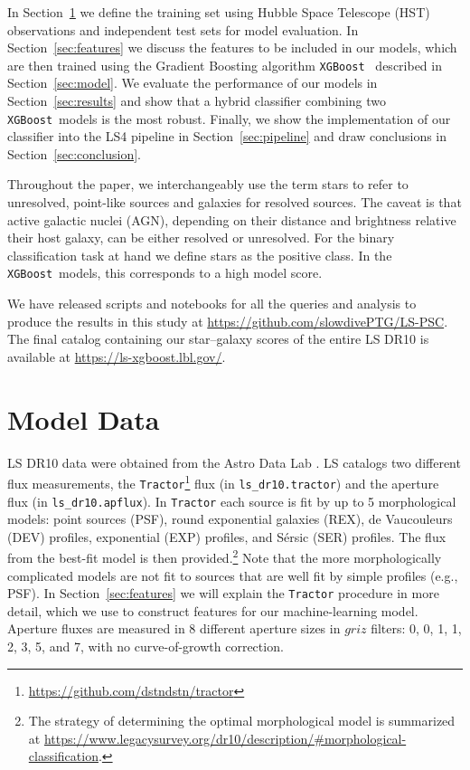 \documentclass[twocolumn,tighten]{aastex631}
\newcommand{\xgboost}{\texttt{XGBoost}}
\newcommand{\dr}[1]{DR{#1}}
\begin{document}
\begin{CJK*}{UTF8}{gbsn}
In Section~\ref{sec:data} we define the training set using Hubble Space Telescope (HST) observations and independent test sets for model evaluation. In Section~\ref{sec:features} we discuss the features to be included in our models, which are then trained using the Gradient Boosting algorithm \xgboost\ \citep{XGBoost_2016} described in Section~\ref{sec:model}. We evaluate the performance of our models in Section~\ref{sec:results} and show that a hybrid classifier combining two \xgboost\ models is the most robust. Finally, we show the implementation of our classifier into the LS4 pipeline in Section~\ref{sec:pipeline} and draw conclusions in Section~\ref{sec:conclusion}.

Throughout the paper, we interchangeably use the term stars to refer to unresolved, point-like sources and galaxies for resolved sources. The caveat is that active galactic nuclei (AGN), depending on their distance and brightness relative their host galaxy, can be either resolved or unresolved. For the binary classification task at hand we define stars as the positive class. In the \xgboost\ models, this corresponds to a high model score. %

We have released scripts and notebooks for all the queries and analysis to produce the results in this study at \url{https://github.com/slowdivePTG/LS-PSC}. The final catalog containing our star--galaxy scores of the entire LS \dr{10} is available at \url{https://ls-xgboost.lbl.gov/}.

\section{Model Data}\label{sec:data}
LS \dr{10} data were obtained from the Astro Data Lab \citep{Fitzpatrick_2014,Nikutta_2020}. LS catalogs two different flux measurements, the \texttt{Tractor}\footnote{\url{https://github.com/dstndstn/tractor}} flux (in \texttt{ls\_dr10.tractor}) and the aperture flux (in \texttt{ls\_dr10.apflux}). In \texttt{Tractor} each source is fit by up to 5 morphological models: point sources (PSF), round exponential galaxies (REX), de Vaucouleurs (DEV) profiles, exponential (EXP) profiles, and S\'ersic (SER) profiles. The flux from the best-fit model is then provided.\footnote{The strategy of determining the optimal morphological model is summarized at \url{https://www.legacysurvey.org/dr10/description/\#morphological-classification}.} Note that the more morphologically complicated models are not fit to sources that are well fit by simple profiles (e.g., PSF). In Section~\ref{sec:features} we will explain the \texttt{Tractor} procedure in more detail, which we use to construct features for our machine-learning model. Aperture fluxes are measured in 8 different aperture sizes in $griz$ filters: 0, 0, 1, 1, 2, 3, 5, and 7, with no curve-of-growth correction.


\end{CJK*}
\end{document}
